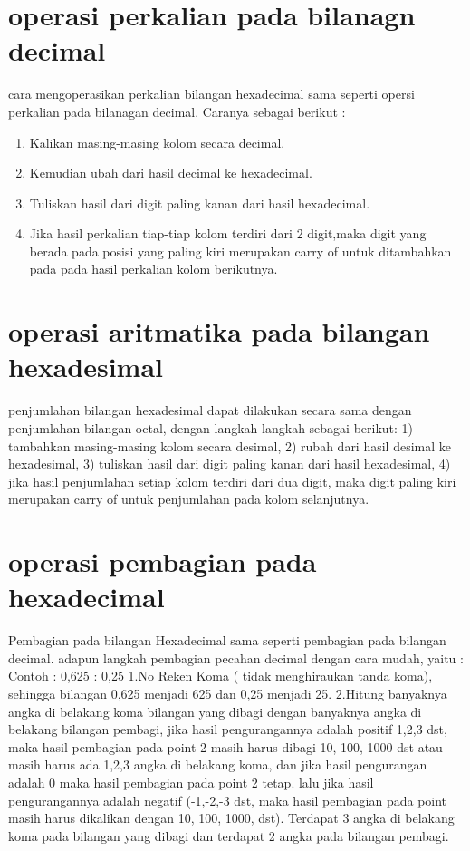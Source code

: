 \section{operasi perkalian pada bilanagn decimal}
cara mengoperasikan perkalian bilangan hexadecimal sama seperti opersi perkalian pada bilanagan decimal. Caranya sebagai berikut :
\begin{enumerate}	
\item Kalikan masing-masing kolom secara decimal.
\item Kemudian ubah dari hasil decimal ke hexadecimal.
\item Tuliskan hasil dari digit paling kanan dari hasil hexadecimal.
\item Jika hasil perkalian tiap-tiap kolom terdiri dari 2 digit,maka digit yang berada pada posisi yang paling kiri merupakan carry of untuk ditambahkan pada pada hasil perkalian kolom berikutnya.
\end{enumerate}

\section{operasi aritmatika pada bilangan hexadesimal}
penjumlahan bilangan hexadesimal dapat dilakukan secara sama dengan penjumlahan bilangan octal, dengan langkah-langkah sebagai berikut: 1) tambahkan masing-masing kolom secara desimal, 2) rubah dari hasil desimal ke hexadesimal, 3) tuliskan hasil dari digit paling kanan dari hasil hexadesimal, 4) jika hasil penjumlahan setiap kolom terdiri dari dua digit, maka digit paling kiri merupakan carry of untuk penjumlahan pada kolom selanjutnya.

\section {operasi pembagian pada hexadecimal}
Pembagian pada bilangan Hexadecimal sama seperti pembagian pada bilangan decimal. adapun langkah pembagian pecahan decimal dengan cara mudah, yaitu :
	Contoh : 0,625 : 0,25
	1.No Reken Koma ( tidak menghiraukan tanda koma), sehingga bilangan 0,625 menjadi 625 dan 0,25 menjadi 25.
	2.Hitung banyaknya angka di belakang koma bilangan yang dibagi dengan banyaknya angka di belakang bilangan pembagi, jika hasil pengurangannya adalah positif 1,2,3 dst, maka hasil pembagian pada point 2 masih harus dibagi 10, 100, 1000 dst atau masih harus ada 1,2,3 angka di belakang koma, dan jika hasil pengurangan adalah 0 maka hasil pembagian pada point 2 tetap. lalu jika hasil pengurangannya adalah negatif (-1,-2,-3 dst, maka hasil pembagian pada point masih harus dikalikan dengan 10, 100, 1000, dst). Terdapat 3 angka di belakang koma pada bilangan yang dibagi dan terdapat 2 angka pada bilangan pembagi. 

